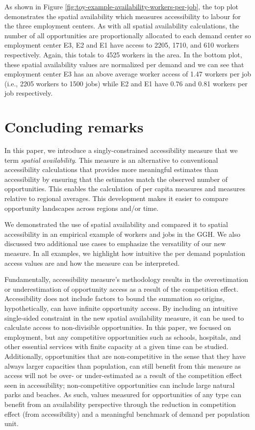 \documentclass[]{elsarticle} %
\begin{document}
As shown in Figure \ref{fig:toy-example-availability-workers-per-job},
the top plot demonstrates the spatial availability which measures
accessibility to labour for the three employment centers. As with all
spatial availability calculations, the number of all opportunities are
proportionally allocated to each demand center so employment center E3,
E2 and E1 have access to 2205, 1710, and 610 workers respectively.
Again, this totals to 4525 workers in the area. In the bottom plot,
these spatial availability values are normalized per demand and we can
see that employment center E3 has an above average worker access of 1.47
workers per job (i.e., 2205 workers to 1500 jobs) while E2 and E1 have
0.76 and 0.81 workers per job respectively.

\newpage

\hypertarget{concluding-remarks}{%
\section{Concluding remarks}\label{concluding-remarks}}

In this paper, we introduce a singly-constrained accessibility measure
that we term \emph{spatial availability}. This measure is an alternative
to conventional accessibility calculations that provides more meaningful
estimates than accessibility by ensuring that the estimates match the
observed number of opportunities. This enables the calculation of per
capita measures and measures relative to regional averages. This
development makes it easier to compare opportunity landscapes across
regions and/or time.

We demonstrated the use of spatial availability and compared it to
spatial accessibility in an empirical example of workers and jobs in the
GGH. We also discussed two additional use cases to emphasize the
versatility of our new measure. In all examples, we highlight how
intuitive the per demand population access values are and how the
measure can be interpreted.

Fundamentally, accessibility measure's methodology results in the
overestimation or underestimation of opportunity access as a result of
the competition effect. Accessibility does not include factors to bound
the summation so origins, hypothetically, can have infinite opportunity
access. By including an intuitive single-sided constraint in the new
spatial availability measure, it can be used to calculate access to
non-divisible opportunities. In this paper, we focused on employment,
but any competitive opportunities such as schools, hospitals, and other
essential services with finite capacity at a given time can be studied.
Additionally, opportunities that are non-competitive in the sense that
they have always larger capacities than population, can still benefit
from this measure as access will not be over- or under-estimated as a
result of the competition effect seen in accessibility; non-competitive
opportunities can include large natural parks and beaches. As such,
values measured for opportunities of any type can benefit from an
availability perspective through the reduction in competition effect
(from accessibility) and a meaningful benchmark of demand per population
unit.
\end{document}
